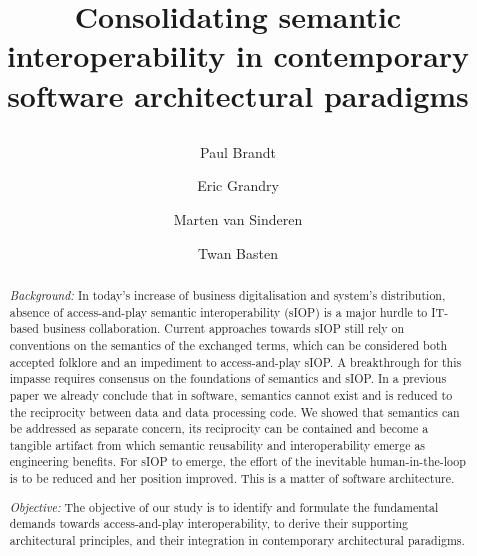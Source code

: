 \documentclass[sort&compress,preprint,authoryear,3p,twocolumn]{elsarticle}
\begin{document}
\begin{frontmatter}

  \title{Consolidating semantic interoperability in contemporary
software architectural paradigms

\author[1]{Paul
Brandt} \author[2]{Eric
Grandry} \author[3]{Marten van
Sinderen} \author[1]{Twan
Basten}

   

\begin{abstract}
\emph{Background:} In today's increase of business digitalisation and
system's distribution, absence of access-and-play semantic
interoperability (sIOP) is a major hurdle to IT-based business
collaboration. Current approaches towards sIOP still rely on conventions
on the semantics of the exchanged terms, which can be considered both
accepted folklore and an impediment to access-and-play sIOP. A
breakthrough for this impasse requires consensus on the foundations of
semantics and sIOP. In a previous paper we already conclude that in
software, semantics cannot exist and is reduced to the reciprocity
between data and data processing code. We showed that semantics can be
addressed as separate concern, its reciprocity can be contained and
become a tangible artifact from which semantic reusability and
interoperability emerge as engineering benefits. For sIOP to emerge, the
effort of the inevitable human-in-the-loop is to be reduced and her
position improved. This is a matter of software architecture.

\emph{Objective:} The objective of our study is to identify and
formulate the fundamental demands towards access-and-play
interoperability, to derive their supporting architectural principles,
and their integration in contemporary architectural paradigms.


\end{abstract}}
\end{frontmatter}
\end{document}
